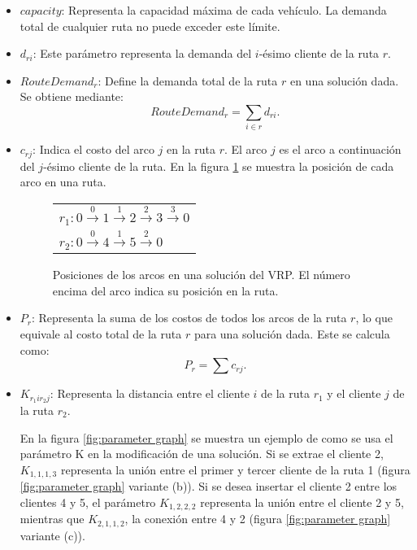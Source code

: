 \documentclass[12pt]{report}
\begin{document}
	\begin{itemize}
		\item $capacity$: Representa la capacidad máxima de cada vehículo. La demanda total de cualquier ruta no puede exceder este límite.
		\item $d_{ri}$: Este parámetro representa la demanda del $i$-ésimo cliente de la ruta $r$.
		\item $RouteDemand_r$: Define la demanda total de la ruta $r$ en una solución dada. Se obtiene mediante:
		\[
		RouteDemand_r = \sum\limits_{i \in r} d_{ri}.
		\]
		\item $c_{rj}$: Indica el costo del arco $j$ en la ruta $r$. El arco $j$ es el arco a continuación del $j$-ésimo cliente de la ruta. En la figura \ref{fig:posicion de arcos} se muestra la posición de cada arco en una ruta.
		\begin{figure}[!h]
			\centering
			\begin{tabular}{l}
				$r_1: 0 \overset{0}{\rightarrow} 1\overset{1}{\rightarrow} 2 \overset{2}{\rightarrow} 3\overset{3}{\rightarrow} 0$\\
				$r_2: 0\overset{0}{\rightarrow} 4\overset{1}{\rightarrow} 5\overset{2}{\rightarrow} 0$
			\end{tabular}
			\caption {Posiciones de los arcos en una solución del VRP. El número encima del arco indica su posición en la ruta.}
			\label{fig:posicion de arcos}
		\end{figure}

		\item {$P_r$: Representa la suma de los costos de todos los arcos de la ruta $r$, lo que equivale al costo total de la ruta $r$ para una solución dada. Este se calcula como:}
		\[
		P_r=\sum c_{rj}.
		\]

		\item $K_{r_1ir_2j}$: Representa la distancia entre el cliente $i$ de la ruta $r_1$ y el cliente $j$ de la ruta $r_2$.

		En la figura \ref{fig:parameter graph} se muestra un ejemplo de como se usa el parámetro K en la modificación de una solución. Si se extrae el cliente 2, $K_{1,1,1,3}$ representa la unión entre el primer y tercer cliente de la ruta 1 (figura \ref{fig:parameter graph} variante (b)). Si se desea insertar el cliente 2 entre los clientes 4 y 5, el parámetro $K_{1,2,2,2}$ representa la unión entre el cliente 2 y 5, mientras que $K_{2,1,1,2}$, la conexión entre 4 y 2 (figura \ref{fig:parameter graph} variante (c)).


\end{itemize}
\end{document}
